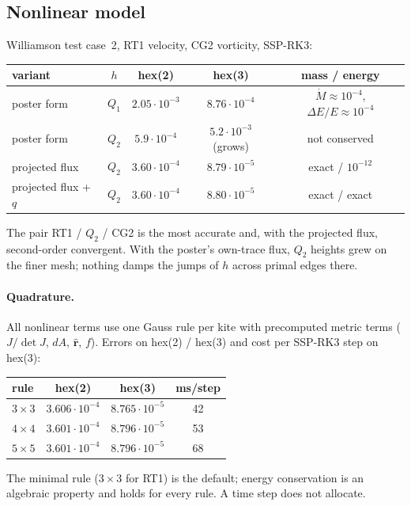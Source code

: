 \documentclass[11pt,a4paper]{article}
\newcommand{\rhat}{\hat{\mathbf{r}}}
\begin{document}
\subsection{Nonlinear model}
Williamson test case~2, RT1 velocity, CG2 vorticity, SSP-RK3:

\begin{center}
\begin{tabular}{lcccc}
\toprule
variant & $h$ & hex(2) & hex(3) & mass / energy \\
\midrule
poster form          & $Q_1$ & $2.05\cdot10^{-3}$ & $8.76\cdot10^{-4}$ & $\dot M\approx10^{-4}$, $\Delta E/E\approx10^{-4}$ \\
poster form          & $Q_2$ & $5.9\cdot10^{-4}$  & $5.2\cdot10^{-3}$ (grows) & not conserved \\
projected flux       & $Q_2$ & $3.60\cdot10^{-4}$ & $8.79\cdot10^{-5}$ & exact / $10^{-12}$ \\
projected flux + $q$ & $Q_2$ & $3.60\cdot10^{-4}$ & $8.80\cdot10^{-5}$ & exact / exact \\
\bottomrule
\end{tabular}
\end{center}
The pair RT1 / $Q_2$ / CG2 is the most accurate and, with the projected flux,
second-order convergent. With the poster's own-trace flux, $Q_2$ heights grew
on the finer mesh; nothing damps the jumps of $h$ across primal edges there.

\paragraph{Quadrature.} All nonlinear terms use one Gauss rule per kite with
precomputed metric terms ($J/\det J$, $dA$, $\rhat$, $f$). Errors on hex(2) /
hex(3) and cost per SSP-RK3 step on hex(3):
\begin{center}
\begin{tabular}{lccc}
\toprule
rule & hex(2) & hex(3) & ms/step \\
\midrule
$3\times3$ & $3.606\cdot10^{-4}$ & $8.765\cdot10^{-5}$ & 42 \\
$4\times4$ & $3.601\cdot10^{-4}$ & $8.796\cdot10^{-5}$ & 53 \\
$5\times5$ & $3.601\cdot10^{-4}$ & $8.796\cdot10^{-5}$ & 68 \\
\bottomrule
\end{tabular}
\end{center}
The minimal rule ($3\times3$ for RT1) is the default; energy conservation is an
algebraic property and holds for every rule. A time step does not allocate.
\end{document}
